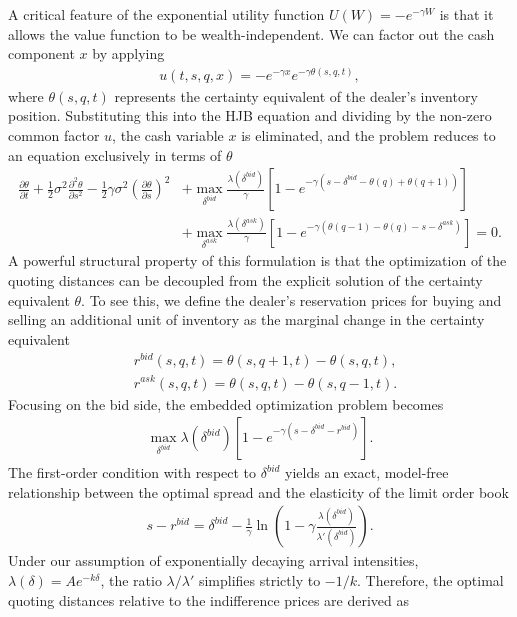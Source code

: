 \documentclass[a4paper,10pt,titlepage,oneside,openany]{book}
\theoremstyle{plain}\newtheorem{theorem}{Theorem}[chapter]
\theoremstyle{definition}\newtheorem{definition}{Definition}[chapter]
\theoremstyle{remark}\newtheorem{remark}{Remark}[chapter]
\begin{document}
A critical feature of the exponential utility function $U(W) = -e^{-\gamma W}$ is that it allows the value function to be wealth-independent. We can factor out the cash component $x$ by applying
\begin{align*}
    u(t,s,q,x) = -e^{-\gamma x}e^{-\gamma \theta(s,q,t)},
\end{align*}
where $\theta(s,q,t)$ represents the certainty equivalent of the dealer's inventory position. Substituting this into the HJB equation and dividing by the non-zero common factor $u$, the cash variable $x$ is eliminated, and the problem reduces to an equation exclusively in terms of $\theta$
\begin{align*}
    \frac{\partial \theta}{\partial t} + \frac{1}{2}\sigma^2 \frac{\partial^2 \theta}{\partial s^2} - \frac{1}{2}\gamma \sigma^2 \left(\frac{\partial \theta}{\partial s}\right)^2 &+ \max_{\delta^{bid}} \frac{\lambda(\delta^{bid})}{\gamma} \left[ 1 - e^{-\gamma (s - \delta^{bid} - \theta(q) + \theta(q+1))} \right] \\
    &+ \max_{\delta^{ask}} \frac{\lambda(\delta^{ask})}{\gamma} \left[ 1 - e^{-\gamma (\theta(q-1) - \theta(q) - s - \delta^{ask})} \right] = 0.
\end{align*}
A powerful structural property of this formulation is that the optimization of the quoting distances can be decoupled from the explicit solution of the certainty equivalent $\theta$. To see this, we define the dealer's reservation prices for buying and selling an additional unit of inventory as the marginal change in the certainty equivalent
\begin{align*}
    &r^{bid}(s,q,t) = \theta(s,q+1,t) - \theta(s,q,t),\\
    &r^{ask}(s,q,t) = \theta(s,q,t) - \theta(s,q-1,t).
\end{align*}
Focusing on the bid side, the embedded optimization problem becomes 
\begin{align*}
    \max_{\delta^{bid}} \lambda(\delta^{bid}) [1 - e^{-\gamma(s - \delta^{bid} - r^{bid})}].
\end{align*}
The first-order condition with respect to $\delta^{bid}$ yields an exact, model-free relationship between the optimal spread and the elasticity of the limit order book
\begin{align*}
    s - r^{bid} =\delta^{bid} - \frac{1}{\gamma} \ln \left( 1 - \gamma \frac{\lambda(\delta^{bid})}{\lambda'(\delta^{bid})} \right).
\end{align*}
Under our assumption of exponentially decaying arrival intensities, $\lambda(\delta) = A e^{-k\delta}$, the ratio $\lambda / \lambda'$ simplifies strictly to $-1/k$. Therefore, the optimal quoting distances relative to the indifference prices are derived as
\end{document}
